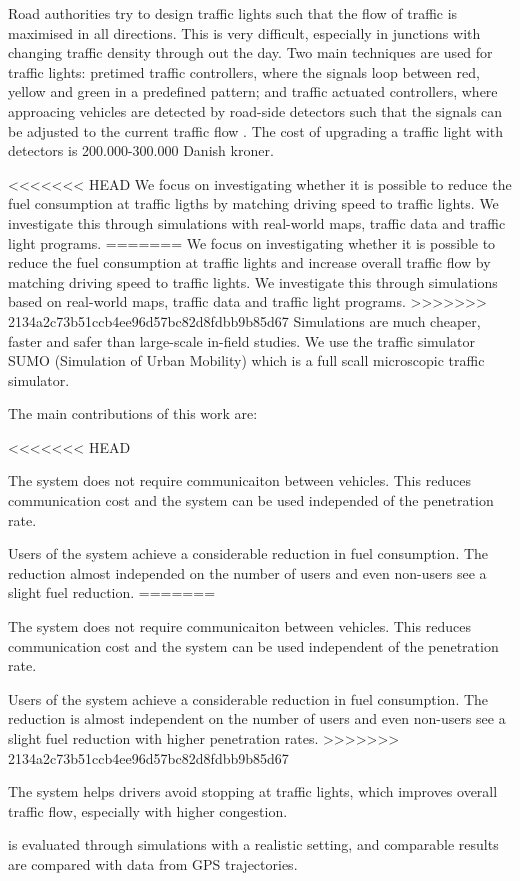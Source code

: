 Road authorities try to design traffic lights such that the flow of traffic is maximised in all directions.
This is very difficult, especially in junctions with changing traffic density through out the day.
Two main techniques are used for traffic lights: pretimed traffic controllers, where the signals loop between red, yellow and green in a predefined pattern; and traffic actuated controllers, where approacing vehicles are detected by road-side detectors such that the signals can be adjusted to the current traffic flow \cite{Vejdir}.
The cost of upgrading a traffic light with detectors is 200.000-300.000 Danish kroner\cite{Vejdir}.

<<<<<<< HEAD
We focus on investigating whether it is possible to reduce the fuel consumption at traffic ligths by matching driving speed to traffic lights. 
We investigate this through simulations with real-world maps, traffic data and traffic light programs.
=======
We focus on investigating whether it is possible to reduce the fuel consumption at traffic lights and increase overall traffic flow by matching driving speed to traffic lights. 
We investigate this through simulations based on real-world maps, traffic data and traffic light programs.
>>>>>>> 2134a2c73b51ccb4ee96d57bc82d8fdbb9b85d67
Simulations are much cheaper, faster and safer than large-scale in-field studies. 
We use the traffic simulator SUMO (Simulation of Urban Mobility)\cite{sumo} which is a full scall microscopic traffic simulator.

The main contributions of this work are:
\begin{enumerate*}
<<<<<<< HEAD
\item The system does not require communicaiton between vehicles. This reduces communication cost and the system can be used independed of the penetration rate.
\item Users of the system achieve a considerable reduction in fuel consumption. The reduction almost independed on the number of users and even non-users see a slight fuel reduction.
=======
\item The system does not require communicaiton between vehicles. This reduces communication cost and the system can be used independent of the penetration rate.
\item Users of the system achieve a considerable reduction in fuel consumption. The reduction is almost independent on the number of users and even non-users see a slight fuel reduction with higher penetration rates.
>>>>>>> 2134a2c73b51ccb4ee96d57bc82d8fdbb9b85d67
\item The system helps drivers avoid stopping at traffic lights, which improves overall traffic flow, especially with higher congestion.
\item \tech is evaluated through simulations with a realistic setting, and comparable results are compared with data from GPS trajectories.
\end{enumerate*}

